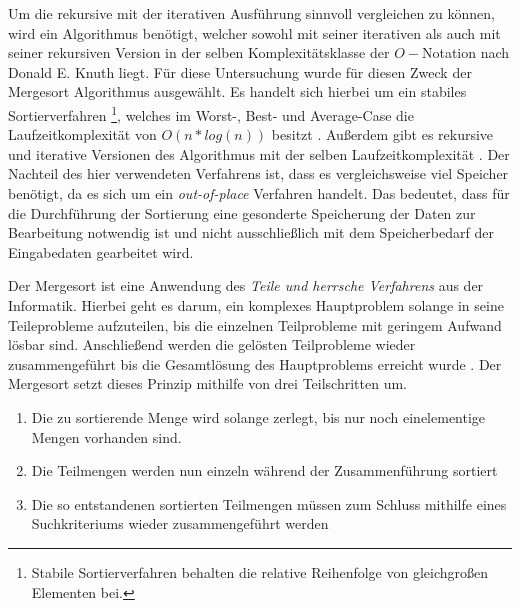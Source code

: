 Um die rekursive mit der iterativen Ausführung  sinnvoll vergleichen zu können, wird ein Algorithmus benötigt, welcher sowohl mit seiner iterativen als auch mit seiner rekursiven Version in der selben Komplexitätsklasse  der $O-$Notation nach  Donald E. Knuth liegt. Für diese Untersuchung wurde für diesen Zweck der Mergesort Algorithmus ausgewählt. Es handelt sich hierbei um ein stabiles Sortierverfahren \footnote{Stabile Sortierverfahren behalten die relative Reihenfolge von gleichgroßen Elementen bei.}, welches im Worst-, Best- und Average-Case die Laufzeitkomplexität von $O(n*log(n))$ besitzt \cite[96]{AlgorithmenDatenstrukturen}. Außerdem gibt es rekursive und iterative Versionen des Algorithmus mit der selben Laufzeitkomplexität \cite[134 f.]{AlgorithmenJurgen}. Der Nachteil des hier verwendeten Verfahrens ist, dass es vergleichsweise viel Speicher benötigt, da es sich um ein \emph{out-of-place} Verfahren handelt. Das bedeutet, dass für die Durchführung der Sortierung eine gesonderte Speicherung der Daten zur Bearbeitung notwendig ist und nicht ausschließlich mit dem Speicherbedarf der Eingabedaten gearbeitet wird.

Der Mergesort ist eine Anwendung des \emph{Teile und herrsche Verfahrens} aus der Informatik. Hierbei geht es darum, ein komplexes Hauptproblem solange in seine Teileprobleme aufzuteilen, bis die einzelnen Teilprobleme mit geringem Aufwand lösbar sind. Anschließend werden die gelösten Teilprobleme wieder zusammengeführt bis die Gesamtlösung des Hauptproblems erreicht wurde \cite[9]{AlgorithmenDatenstrukturen}. Der Mergesort setzt dieses Prinzip mithilfe von drei Teilschritten um.
\begin{enumerate}
\item Die zu sortierende Menge wird solange zerlegt, bis nur noch einelementige Mengen vorhanden sind.
\item Die Teilmengen werden nun einzeln während der Zusammenführung sortiert
\item Die so entstandenen sortierten Teilmengen müssen zum Schluss mithilfe eines Suchkriteriums wieder zusammengeführt werden 
\end{enumerate}

